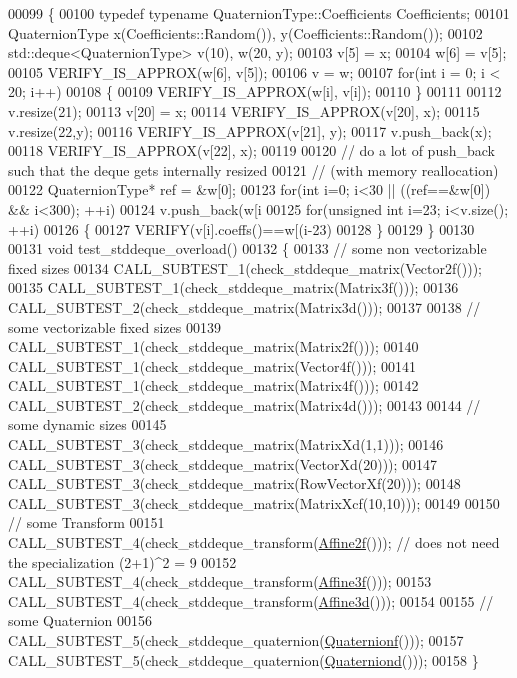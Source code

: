 \begin{DoxyCode}
00099 \{
00100   \textcolor{keyword}{typedef} \textcolor{keyword}{typename} QuaternionType::Coefficients Coefficients;
00101   QuaternionType x(Coefficients::Random()), y(Coefficients::Random());
00102   std::deque<QuaternionType> v(10), w(20, y);
00103   v[5] = x;
00104   w[6] = v[5];
00105   VERIFY\_IS\_APPROX(w[6], v[5]);
00106   v = w;
00107   \textcolor{keywordflow}{for}(\textcolor{keywordtype}{int} i = 0; i < 20; i++)
00108   \{
00109     VERIFY\_IS\_APPROX(w[i], v[i]);
00110   \}
00111 
00112   v.resize(21);
00113   v[20] = x;
00114   VERIFY\_IS\_APPROX(v[20], x);
00115   v.resize(22,y);
00116   VERIFY\_IS\_APPROX(v[21], y);
00117   v.push\_back(x);
00118   VERIFY\_IS\_APPROX(v[22], x);
00119 
00120   \textcolor{comment}{// do a lot of push\_back such that the deque gets internally resized}
00121   \textcolor{comment}{// (with memory reallocation)}
00122   QuaternionType* ref = &w[0];
00123   \textcolor{keywordflow}{for}(\textcolor{keywordtype}{int} i=0; i<30 || ((ref==&w[0]) && i<300); ++i)
00124     v.push\_back(w[i%
00125   \textcolor{keywordflow}{for}(\textcolor{keywordtype}{unsigned} \textcolor{keywordtype}{int} i=23; i<v.size(); ++i)
00126   \{
00127     VERIFY(v[i].coeffs()==w[(i-23)%
00128   \}
00129 \}
00130 
00131 \textcolor{keywordtype}{void} test\_stddeque\_overload()
00132 \{
00133   \textcolor{comment}{// some non vectorizable fixed sizes}
00134   CALL\_SUBTEST\_1(check\_stddeque\_matrix(Vector2f()));
00135   CALL\_SUBTEST\_1(check\_stddeque\_matrix(Matrix3f()));
00136   CALL\_SUBTEST\_2(check\_stddeque\_matrix(Matrix3d()));
00137 
00138   \textcolor{comment}{// some vectorizable fixed sizes}
00139   CALL\_SUBTEST\_1(check\_stddeque\_matrix(Matrix2f()));
00140   CALL\_SUBTEST\_1(check\_stddeque\_matrix(Vector4f()));
00141   CALL\_SUBTEST\_1(check\_stddeque\_matrix(Matrix4f()));
00142   CALL\_SUBTEST\_2(check\_stddeque\_matrix(Matrix4d()));
00143 
00144   \textcolor{comment}{// some dynamic sizes}
00145   CALL\_SUBTEST\_3(check\_stddeque\_matrix(MatrixXd(1,1)));
00146   CALL\_SUBTEST\_3(check\_stddeque\_matrix(VectorXd(20)));
00147   CALL\_SUBTEST\_3(check\_stddeque\_matrix(RowVectorXf(20)));
00148   CALL\_SUBTEST\_3(check\_stddeque\_matrix(MatrixXcf(10,10)));
00149 
00150   \textcolor{comment}{// some Transform}
00151   CALL\_SUBTEST\_4(check\_stddeque\_transform(\hyperlink{group___geometry___module_ga2c1ea05a21899654ee3a2e3f91fa30e0}{Affine2f}())); \textcolor{comment}{// does not need the specialization (2+1)^2
       = 9}
00152   CALL\_SUBTEST\_4(check\_stddeque\_transform(\hyperlink{group___geometry___module_ga17e901de8ff882aea7845c5457db6a4f}{Affine3f}()));
00153   CALL\_SUBTEST\_4(check\_stddeque\_transform(\hyperlink{group___geometry___module_gaaffa69d3143826efeb84e5d6c56a4c78}{Affine3d}()));
00154 
00155   \textcolor{comment}{// some Quaternion}
00156   CALL\_SUBTEST\_5(check\_stddeque\_quaternion(\hyperlink{group___geometry___module_ga785b13a5a87f9bf55d4eba51ead2dcf0}{Quaternionf}()));
00157   CALL\_SUBTEST\_5(check\_stddeque\_quaternion(\hyperlink{group___geometry___module_ga6e77eb8b6aae0e04be2db88107dbc642}{Quaterniond}()));
00158 \}
\end{DoxyCode}
